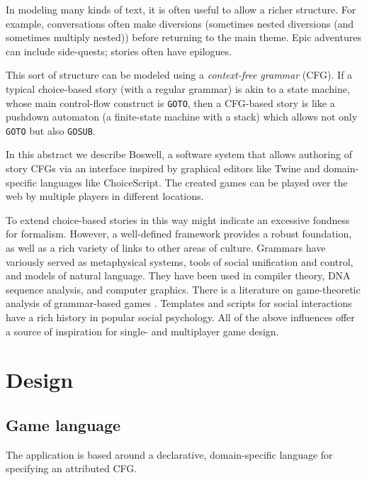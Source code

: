 \documentclass{acm_proc_article-sp}
\begin{document}
In modeling many kinds of text, it is often useful to allow a richer structure.
For example, conversations often make diversions (sometimes nested diversions (and sometimes multiply nested))
before returning to the main theme.
Epic adventures can include side-quests; stories often have epilogues.

This sort of structure can be modeled using a {\em context-free grammar} (CFG).
If a typical choice-based story (with a regular grammar) is akin to a state machine,
 whose main control-flow construct is {\tt GOTO},
then a CFG-based story is like a pushdown automaton (a finite-state machine with a stack)
 which allows not only {\tt GOTO} but also {\tt GOSUB}.

In this abstract we describe Boswell, a software system that allows authoring of story CFGs
via an interface inspired by graphical editors like Twine and domain-specific languages like ChoiceScript.
The created games can be played over the web by multiple players in different locations.

To extend choice-based stories in this way might indicate an excessive fondness for formalism.
However, a well-defined framework provides a robust foundation, as well as a rich variety of links to other areas of culture.
Grammars have variously served as metaphysical systems\cite{Ashtadhyayi,luhtala2005grammar},
tools of social unification and control\cite{AcademieFrancaise,RobertLowth},
and models of natural language\cite{Durbin98}.
They have been used in compiler theory\cite{aho2007compilers},
DNA sequence analysis\cite{Durbin98}, and
computer graphics\cite{LSystems}.
There is a literature on game-theoretic analysis of grammar-based games
\cite{DBLP:conf/icalp/EtessamiWY08}.
Templates and scripts for social interactions
 have a rich history in popular social psychology\cite{berne1973games,berne1973you}.
All of the above influences offer a source of inspiration for single- and multiplayer game design.

\section{Design}

\subsection{Game language}

The application is based around
a declarative, domain-specific language for specifying an attributed CFG.
\end{document}
